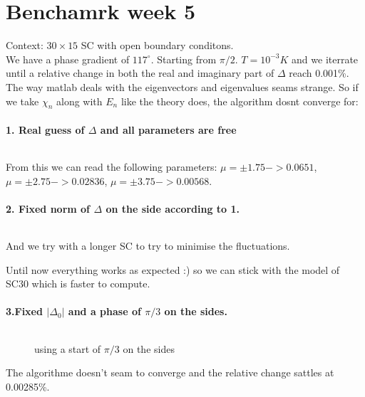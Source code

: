 \documentclass[../main.tex]{subfiles}
\begin{document}
\section{Benchamrk week 5}
Context: $30\times 15$ SC with open boundary conditons.\\

We have a phase gradient of $117^{\circ}$. Starting from $\pi/2$. $T=10^{-3}K$ and we iterrate until a relative
change in both the real and imaginary part of $\Delta$ reach 0.001\%. \\

The way matlab deals with the eigenvectors and eigenvalues seams strange. So if we take $\chi_n$ along with $E_n$
like the theory does, the algorithm dosnt converge for: 
\paragraph{1. Real guess of $\Delta$ and all parameters are free}$~$\\
\begin{figure}[H]
    \centering
    
    \caption{}
\end{figure}
From this we can read the following parameters: $\mu = \pm 1.75 -> 0.0651$, $\mu = \pm 2.75 -> 0.02836$, $\mu = \pm 3.75 -> 0.00568$.
\\

\paragraph{2. Fixed norm of $\Delta$ on the side according to 1.}$~$\\
\begin{figure}[H]
    \centering
    
    \caption{}
\end{figure}
And we try with a longer SC to try to minimise the fluctuations.
\begin{figure}[H]
    \centering
    
    \caption{}
\end{figure}
Until now everything works as expected :) so we can stick with the model of SC30 which is faster to compute.\\

\paragraph{3.Fixed $|\Delta_0|$ and a phase of $\pi/3$ on the sides.}$~$\\
\begin{figure}[H]
    \centering
    
    \caption{using a start of $\pi/3$ on the sides}
\end{figure}
The algorithme doesn't seam to converge and the relative change sattles at 0.00285\%.\\
\end{document}
